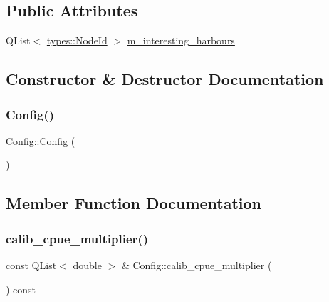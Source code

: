 \subsection*{Public Attributes}
\begin{DoxyCompactItemize}
\item 
Q\+List$<$ \mbox{\hyperlink{classtypes_1_1_node_id}{types\+::\+Node\+Id}} $>$ \mbox{\hyperlink{class_config_a412f802599694d3259049599c344e267}{m\+\_\+interesting\+\_\+harbours}}
\end{DoxyCompactItemize}


\subsection{Constructor \& Destructor Documentation}
\mbox{\label{class_config_abd0c571c116924871e30444b192b792a}} 
\subsubsection{\texorpdfstring{Config()}{Config()}}
{\footnotesize\ttfamily Config\+::\+Config (\begin{DoxyParamCaption}{ }\end{DoxyParamCaption})}



\subsection{Member Function Documentation}
\mbox{\label{class_config_afcd156348309481d3b0d05b68ce1a7a7}} 
\subsubsection{\texorpdfstring{calib\_cpue\_multiplier()}{calib\_cpue\_multiplier()}}
{\footnotesize\ttfamily const Q\+List$<$ double $>$ \& Config\+::calib\+\_\+cpue\+\_\+multiplier (\begin{DoxyParamCaption}{ }\end{DoxyParamCaption}) const}

\mbox{\label{class_config_a7280b5ac9f8b20f5d387d1a2f4d27422}} 
